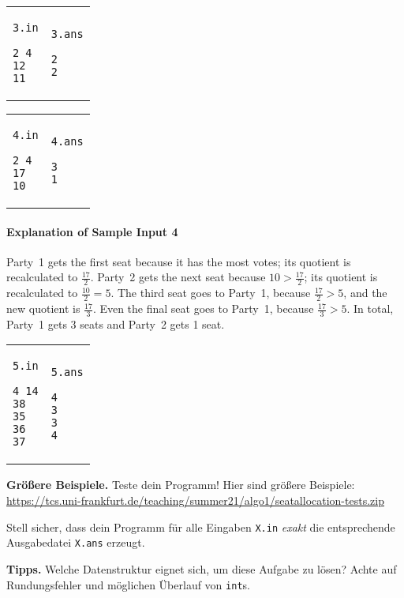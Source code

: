 \documentclass{uebung_cs}
\begin{document}
\begin{tabular}{p{}p{}}
\texttt{3.in}
\begin{verbatim}
2 4
12
11
\end{verbatim}
&
\texttt{3.ans}
\begin{verbatim}
2
2
\end{verbatim}
\end{tabular}

\begin{tabular}{p{}p{}}
\texttt{4.in}
\begin{verbatim}
2 4
17
10
\end{verbatim}
&
\texttt{4.ans}
\begin{verbatim}
3
1
\end{verbatim}
\end{tabular}

\paragraph{Explanation of Sample Input 4}
Party~1 gets the first seat because it has the most votes; its quotient is recalculated to $\frac{17}{2}$.
Party~2 gets the next seat because $10>\frac{17}{2}$; its quotient is recalculated to $\frac{10}{2}=5$.
The third seat goes to Party~1, because $\frac{17}{2}>5$, and the new quotient is $\frac{17}{3}$.
Even the final seat goes to Party~1, because $\frac{17}{3}>5$.
In total, Party~1 gets 3 seats and Party~2 gets 1 seat.

\begin{tabular}{p{}p{}}
\texttt{5.in}
\begin{verbatim}
4 14
38
35
36
37
\end{verbatim}
&
\texttt{5.ans}
\begin{verbatim}
4
3
3
4
\end{verbatim}
\end{tabular}

\textbf{Größere Beispiele.}
Teste dein Programm! Hier sind größere Beispiele:
\url{https://tcs.uni-frankfurt.de/teaching/summer21/algo1/seatallocation-tests.zip}

Stell sicher, dass dein Programm für alle Eingaben \texttt{X.in} \emph{exakt} die entsprechende Ausgabedatei \texttt{X.ans} erzeugt.

\textbf{Tipps.}
Welche Datenstruktur eignet sich, um diese Aufgabe zu lösen? Achte auf Rundungsfehler und möglichen Überlauf von \texttt{int}s.
\end{document}
